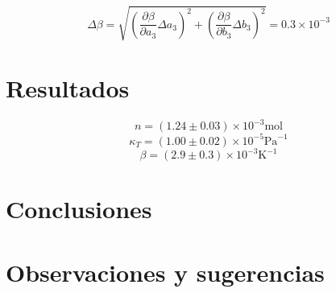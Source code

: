 \documentclass[a4paper,12pt]{article}
\begin{document}
\begin{equation}
  \Delta \beta = \sqrt{\left(\frac{\partial \beta }{\partial a_3} \Delta a_3\right)^2 + \left(\frac{\partial \beta }{\partial b_3} \Delta b_3\right)^2} = 0.3 \times 10^{-3} 
\end{equation}

\section{Resultados}
\begin{tcolorbox}
  \begin{equation}
    n = \left(1.24 \pm 0.03\right) \times 10^{-3} \text{mol}
  \end{equation}
  \begin{equation}
    \kappa_T = \left(1.00 \pm 0.02\right) \times 10^{-5} \text{Pa}^{-1}
  \end{equation}
  \begin{equation}
    \beta = \left(2.9 \pm 0.3\right) \times 10^{-3} \text{K}^{-1}
  \end{equation}
\end{tcolorbox}
\section{Conclusiones}

\section{Observaciones y sugerencias}
\end{document}

